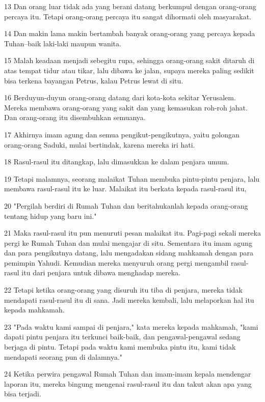 \par 13 Dan orang luar tidak ada yang berani datang berkumpul dengan orang-orang percaya itu. Tetapi orang-orang percaya itu sangat dihormati oleh masyarakat.
\par 14 Dan makin lama makin bertambah banyak orang-orang yang percaya kepada Tuhan--baik laki-laki maupun wanita.
\par 15 Malah keadaan menjadi sebegitu rupa, sehingga orang-orang sakit ditaruh di atas tempat tidur atau tikar, lalu dibawa ke jalan, supaya mereka paling sedikit bisa terkena bayangan Petrus, kalau Petrus lewat di situ.
\par 16 Berduyun-duyun orang-orang datang dari kota-kota sekitar Yerusalem. Mereka membawa orang-orang yang sakit dan yang kemasukan roh-roh jahat. Dan orang-orang itu disembuhkan semuanya.
\par 17 Akhirnya imam agung dan semua pengikut-pengikutnya, yaitu golongan orang-orang Saduki, mulai bertindak, karena mereka iri hati.
\par 18 Rasul-rasul itu ditangkap, lalu dimasukkan ke dalam penjara umum.
\par 19 Tetapi malamnya, seorang malaikat Tuhan membuka pintu-pintu penjara, lalu membawa rasul-rasul itu ke luar. Malaikat itu berkata kepada rasul-rasul itu,
\par 20 "Pergilah berdiri di Rumah Tuhan dan beritahukanlah kepada orang-orang tentang hidup yang baru ini."
\par 21 Maka rasul-rasul itu pun menuruti pesan malaikat itu. Pagi-pagi sekali mereka pergi ke Rumah Tuhan dan mulai mengajar di situ. Sementara itu imam agung dan para pengikutnya datang, lalu mengadakan sidang mahkamah dengan para pemimpin Yahudi. Kemudian mereka menyuruh orang pergi mengambil rasul-rasul itu dari penjara untuk dibawa menghadap mereka.
\par 22 Tetapi ketika orang-orang yang disuruh itu tiba di penjara, mereka tidak mendapati rasul-rasul itu di sana. Jadi mereka kembali, lalu melaporkan hal itu kepada mahkamah.
\par 23 "Pada waktu kami sampai di penjara," kata mereka kepada mahkamah, "kami dapati pintu penjara itu terkunci baik-baik, dan pengawal-pengawal sedang berjaga di pintu. Tetapi pada waktu kami membuka pintu itu, kami tidak mendapati seorang pun di dalamnya."
\par 24 Ketika perwira pengawal Rumah Tuhan dan imam-imam kepala mendengar laporan itu, mereka bingung mengenai rasul-rasul itu dan takut akan apa yang bisa terjadi.

